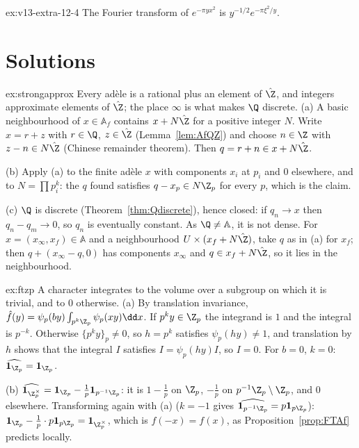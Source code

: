 \begin{hint}{ex:v13-extra-12-4}
The Fourier transform of $e^{-\pi yx^2}$ is $y^{-1/2}e^{-\pi\xi^2/y}$.
\end{hint}

\section{Solutions}

\begin{solution}{ex:strongapprox}
\idea Every ad\`ele is a rational plus an element of $\hat{\Z}$, and integers approximate elements of $\hat{\Z}$; the place $\infty$ is what makes $\Q$ discrete.
\writeup (a) A basic neighbourhood of $x\in\mathbb{A}_f$ contains $x+N\hat{\Z}$ for a positive integer $N$. Write $x=r+z$ with $r\in\Q$, $z\in\hat{\Z}$
(Lemma~\ref{lem:AfQZ}) and choose $n\in\Z$ with $z-n\in N\hat{\Z}$ (Chinese remainder theorem). Then $q=r+n\in x+N\hat{\Z}$.

(b) Apply (a) to the finite ad\`ele $x$ with components $x_i$ at $p_i$ and $0$ elsewhere, and to $N=\prod p_i^k$: the $q$ found satisfies
$q-x_{p}\in N\Z_p$ for every $p$, which is the claim.

(c) $\Q$ is discrete (Theorem~\ref{thm:Qdiscrete}), hence closed: if $q_n\to x$ then $q_n-q_m\to0$, so $q_n$ is eventually constant. As $\Q\ne\mathbb{A}$, it is not
dense. For $x=(x_\infty,x_f)\in\mathbb{A}$ and a neighbourhood $U\times(x_f+N\hat{\Z})$, take $q$ as in (a) for $x_f$; then $q+(x_\infty-q,0)$ has components $x_\infty$
and $q\in x_f+N\hat{\Z}$, so it lies in the neighbourhood.
\end{solution}

\begin{solution}{ex:ftzp}
\idea A character integrates to the volume over a subgroup on which it is trivial, and to $0$ otherwise.
\writeup (a) By translation invariance, $\hat f(y)=\psi_p(by)\int_{p^k\Z_p}\psi_p(xy)\dd x$. If $p^ky\in\Z_p$ the integrand is $1$ and the integral is $p^{-k}$.
Otherwise $\{p^ky\}_p\ne0$, so $h=p^k$ satisfies $\psi_p(hy)\ne1$, and translation by $h$ shows that the integral $I$ satisfies $I=\psi_p(hy)I$, so $I=0$. For
$b=0$, $k=0$: $\widehat{\mathbf 1_{\Z_p}}=\mathbf 1_{\Z_p}$.

(b) $\widehat{\mathbf 1_{\Z_p^\times}}=\mathbf 1_{\Z_p}-\frac1p\mathbf 1_{p^{-1}\Z_p}$: it is $1-\frac1p$ on $\Z_p$, $-\frac1p$ on $p^{-1}\Z_p\setminus\Z_p$, and $0$ elsewhere.
Transforming again with (a) ($k=-1$ gives $\widehat{\mathbf 1_{p^{-1}\Z_p}}=p\mathbf 1_{p\Z_p}$): $\mathbf 1_{\Z_p}-\frac1p\cdot p\mathbf 1_{p\Z_p}=\mathbf 1_{\Z_p^\times}$, which is
$f(-x)=f(x)$, as Proposition~\ref{prop:FTAf} predicts locally.
\end{solution}

